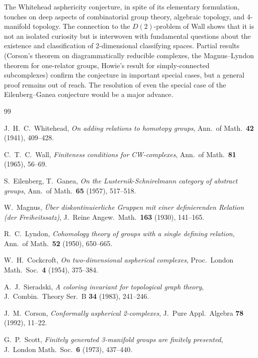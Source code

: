 \documentclass[12pt,a4paper]{amsart}
\theoremstyle{definition}
\theoremstyle{remark}
\begin{document}
The Whitehead asphericity conjecture, in spite of its elementary
formulation, touches on deep aspects of combinatorial group theory,
algebraic topology, and 4-manifold topology. The connection to the
$D(2)$-problem of Wall shows that it is not an isolated curiosity
but is interwoven with fundamental questions about the existence and
classification of 2-dimensional classifying spaces. Partial results
(Corson's theorem on diagrammatically reducible complexes, the
Magnus--Lyndon theorem for one-relator groups, Howie's result for
simply-connected subcomplexes) confirm the conjecture in important
special cases, but a general proof remains out of reach. The resolution
of even the special case of the Eilenberg--Ganea conjecture would be a
major advance.

\begin{thebibliography}{99}

J.~H.~C.~Whitehead,
\textit{On adding relations to homotopy groups},
Ann.\ of Math.\ \textbf{42} (1941), 409--428.

C.~T.~C.~Wall,
\textit{Finiteness conditions for CW-complexes},
Ann.\ of Math.\ \textbf{81} (1965), 56--69.

S.~Eilenberg, T.~Ganea,
\textit{On the Lusternik-Schnirelmann category of abstract groups},
Ann.\ of Math.\ \textbf{65} (1957), 517--518.

W.~Magnus,
\textit{Über diskontinuierliche Gruppen mit einer definierenden Relation
(der Freiheitssatz)},
J.\ Reine Angew.\ Math.\ \textbf{163} (1930), 141--165.

R.~C.~Lyndon,
\textit{Cohomology theory of groups with a single defining relation},
Ann.\ of Math.\ \textbf{52} (1950), 650--665.

W.~H.~Cockcroft,
\textit{On two-dimensional aspherical complexes},
Proc.\ London Math.\ Soc.\ \textbf{4} (1954), 375--384.

A.~J.~Sieradski,
\textit{A coloring invariant for topological graph theory},
J.\ Combin.\ Theory Ser.\ B \textbf{34} (1983), 241--246.

J.~M.~Corson,
\textit{Conformally aspherical 2-complexes},
J.\ Pure Appl.\ Algebra \textbf{78} (1992), 11--22.

G.~P.~Scott,
\textit{Finitely generated 3-manifold groups are finitely presented},
J.\ London Math.\ Soc.\ \textbf{6} (1973), 437--440.


\end{thebibliography}
\end{document}
